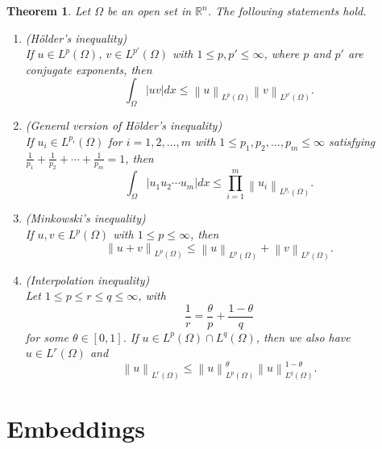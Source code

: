 \documentclass[11pt,a4paper]{report}
\newtheorem{theorem}{Theorem}[section]
\theoremstyle{definition}
\begin{document}
\begin{theorem}
	Let $\Omega$ be an open set in $\mathbb{R}^{n}$.
	The following statements hold.
	\begin{enumerate}[label=(\alph*)] 
		\rm\item (H\"{o}lder's inequality) \\[0.1cm]
		If $u \in L^p(\Omega)$, $v \in L^{p'}(\Omega)$ with $1 \leq p, p' \leq \infty$, where $p$ and $p'$ are conjugate exponents, then 
		\begin{equation*} 
			\int_{\Omega} |uv|dx \leq \left\| u \right\|_{L^p(\Omega)} \left\| v \right\|_{L^{p'}(\Omega)}.
		\end{equation*}
		\rm\item (General version of H\"{o}lder's inequality) \\[0.1cm]
		If $u_i \in L^{p_i}(\Omega)$ for $i = 1, 2, \ldots, m$ with $1 \leq p_1, p_2, \ldots, p_m \leq \infty$ satisfying $\frac{1}{p_1} + \frac{1}{p_2} + \cdots + \frac{1}{p_m} = 1$, then 
		\begin{equation*} 
			\int_{\Omega} |u_1 u_2 \cdots u_m |dx \leq \prod_{i=1}^m \left\| u_i \right\|_{L^{p_i}(\Omega)}.
		\end{equation*}
		\rm\item (Minkowski's inequality)\\[0.1cm]
		If $u, v \in L^p(\Omega)$ with $1 \leq p  \leq \infty$, then 
		\begin{equation*} 
			\left\| u + v\right\|_{L^p(\Omega)} \leq \left\| u \right\|_{L^p(\Omega)} + \left\| v \right\|_{L^p(\Omega)}.
		\end{equation*}
		\rm\item (Interpolation inequality)\\[0.1cm]
		Let $1 \leq p \leq r \leq q \leq \infty$, with 
		\begin{equation*} 
			\frac{1}{r} = \frac{\theta}{p} + \frac{1 - \theta}{q}
		\end{equation*}
		for some $\theta \in [0, 1]$.
		If $u \in L^p(\Omega) \cap L^q(\Omega)$, then we also have $u \in L^r(\Omega)$ and 
		\begin{equation*} 
			\left\| u \right\|_{L^r(\Omega)} \leq \left\| u \right\|^{\theta}_{L^p(\Omega)} \left\| u \right\|^{1 - \theta}_{L^q(\Omega)}.
		\end{equation*}
	\end{enumerate}
\end{theorem}


\chapter{Embeddings}
\end{document}
